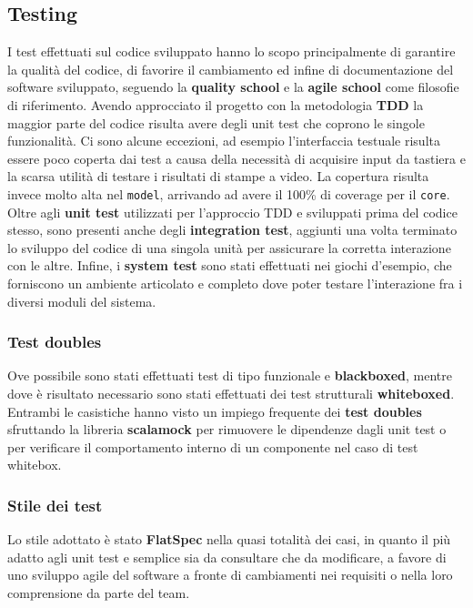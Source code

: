 \subsection{Testing}
I test effettuati sul codice sviluppato hanno lo scopo principalmente di garantire la qualità del codice, di favorire il cambiamento ed infine di documentazione del software sviluppato, seguendo la \textbf{quality school} e la \textbf{agile school} come filosofie di riferimento.
%
Avendo approcciato il progetto con la metodologia \textbf{TDD} la maggior parte del codice risulta avere degli unit test che coprono le singole funzionalità.
%
Ci sono alcune eccezioni, ad esempio l'interfaccia testuale risulta essere poco coperta dai test a causa della necessità di acquisire input da tastiera e la scarsa utilità di testare i risultati di stampe a video.
%
La copertura risulta invece molto alta nel \texttt{model}, arrivando ad avere il 100\% di coverage per il \texttt{core}.
%
Oltre agli \textbf{unit test} utilizzati per l'approccio TDD e sviluppati prima del codice stesso, sono presenti anche degli \textbf{integration test}, aggiunti una volta terminato lo sviluppo del codice di una singola unità per assicurare la corretta interazione con le altre.
%
Infine, i \textbf{system test} sono stati effettuati nei giochi d'esempio, che forniscono un ambiente articolato e completo dove poter testare l'interazione fra i diversi moduli del sistema.

\subsubsection{Test doubles}
Ove possibile sono stati effettuati test di tipo funzionale e \textbf{blackboxed}, mentre dove è risultato necessario sono stati effettuati dei test strutturali \textbf{whiteboxed}.
%
Entrambi le casistiche hanno visto un impiego frequente dei \textbf{test doubles} sfruttando la libreria \textbf{scalamock} per rimuovere le dipendenze dagli unit test o per verificare il comportamento interno di un componente nel caso di test whitebox.

\subsubsection{Stile dei test}
Lo stile adottato è stato \textbf{FlatSpec} nella quasi totalità dei casi, in quanto il più adatto agli unit test e semplice sia da consultare che da modificare, a favore di uno sviluppo agile del software a fronte di cambiamenti nei requisiti o nella loro comprensione da parte del team.

